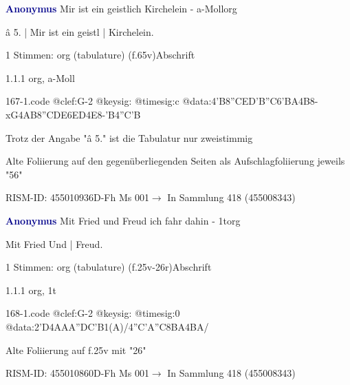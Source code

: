 \documentclass[twocolumn]{book}
\begin{document}
\par \vspace{7pt} \textcolor{darkblue}{\textbf{Anonymus  }}\hfillplus{\textbf{[167]}}\newline Mir ist ein geistlich Kirchelein - a-Moll\newline org
\par \begin{itshape}[f.65v, at left:] â 5. | Mir ist ein geistl | Kirchelein.\end{itshape} 
\par \textcolor{darkblue}{}  1 Stimmen: org (tabulature)  (f.65v)\newline Abschrift
\par 1.1.1  org, a-Moll  
\begin{filecontents*}{167-1.code}
@clef:G-2
@keysig:
@timesig:c
@data:4'B{8''CE}{D'B''C6'BA}4B8-xG4AB{8''CDE6ED}4E8-'B4''C'B
\end{filecontents*}
\newline
%
\par Trotz der Angabe "â 5." ist die Tabulatur nur zweistimmig
\par Alte Foliierung auf den gegenüberliegenden Seiten als Aufschlagfoliierung jeweils "56"
\par RISM-ID: 455010936\newline D-Fh  Ms 001\newline $\rightarrow$ In Sammlung 418 (455008343)
      
\par \vspace{7pt} \textcolor{darkblue}{\textbf{Anonymus  }}\hfillplus{\textbf{[168]}}\newline Mit Fried und Freud ich fahr dahin - 1t\newline org
\par \begin{itshape}[f.25v, at left:] Mit Fried Und | Freud.\end{itshape} 
\par \textcolor{darkblue}{}  1 Stimmen: org (tabulature)  (f.25v-26r)\newline Abschrift
\par 1.1.1  org, 1t  
\begin{filecontents*}{168-1.code}
@clef:G-2
@keysig:
@timesig:0
@data:2'D4AAA''DC'B1(A)/4''C'A''C{8BA}4BA/
\end{filecontents*}
\newline
%
\par Alte Foliierung auf f.25v mit "26"
\par RISM-ID: 455010860\newline D-Fh  Ms 001\newline $\rightarrow$ In Sammlung 418 (455008343)
      
\end{document}
